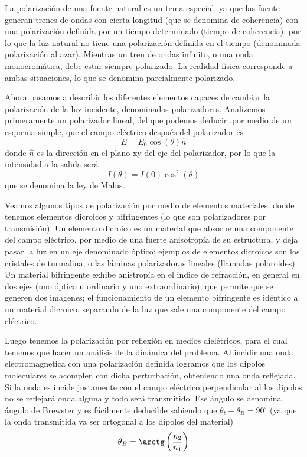 \documentclass[a4paper,spanish]{article}
\numberwithin{equation}{section}
\begin{document}
	La polarizaci\'on de una fuente natural es un tema especial, ya que las fuente generan trenes de ondas con cierta longitud (que se denomina de coherencia) con una polarizaci\'on definida por un tiempo determinado (tiempo de coherencia), por lo que la luz natural no tiene una polarizaci\'on definida en el tiempo (denominada polarizaci\'on al azar). Mientras un tren de ondas infinito, o una onda monocrom\'atica, debe estar siempre polarizado. La realidad f\'isica corresponde a ambas situaciones, lo que se denomina parcialmente polarizado.
	
	Ahora pasamos a describir los diferentes elementos capaces de cambiar la polarizaci\'on de la luz incidente, denominados polarizadores. Analizemos primeramente un polarizador lineal, del que podemos deducir ,por medio de un esquema simple, que el campo el\'ectrico despu\'es del polarizador es \[E = E_0 \cos(\theta) \hat{n}\] donde $\hat{n}$ es la direcci\'on en el plano xy del eje del polarizador, por lo que la intensidad a la salida ser\'a
	\begin{equation}
		I(\theta) = I(0) \cos^2(\theta)
		\label{eq:polarizacion_malus}
	\end{equation}
	que se denomina la ley de Malus. 
	
	Veamos algunos tipos de polarizaci\'on por medio de elementos materiales, donde tenemos elementos dicroicos y bifringentes (lo que son polarizadores por transmisi\'on). Un elemento dicroico es un material que absorbe una componente del campo el\'ectrico, por medio de una fuerte anisotrop\'ia de su estructura, y deja pasar la luz en un eje denominado \'optico; ejemplos de elementos dicroicos son los cristales de turmalina, o las l\'aminas polarizadoras lineales (llamadas polaroides). Un material bifringente exhibe anistrop\'ia en el indice de refracci\'on, en general en dos ejes (uno \'optico u ordinario y uno extraordinario), que permite que se generen dos imagenes; el funcionamiento de un elemento bifringente es id\'entico a un material dicroico, separando de la luz que sale una componente del campo el\'ectrico.
	
	Luego tenemos la polarizaci\'on por reflexi\'on en medios diel\'etricos, para el cual tenemos que hacer un an\'alisis de la din\'amica del problema. Al incidir una onda electromagnetica con una polarizaci\'on definida logramos que los dipolos moleculares se acomplen con dicha perturbaci\'on, obteniendo una onda reflejada. Si la onda es incide justamente con el campo el\'ectrico perpendicular al los dipolos no se reflejar\'a onda alguna y todo ser\'a transmitido. Ese \'angulo se denomina \'angulo de Brewster y es f\'acilmente deducible sabiendo que $\theta_t + \theta_B = 90^\circ$ (ya que la onda transmitida va ser ortogonal a los dipolos del material)
	\begin{equation}
		\theta_B = \arctg\left(\frac{n_2}{n_1}\right)
		\label{eq:polarizacion_brewster}
	\end{equation}
	
\end{document}
